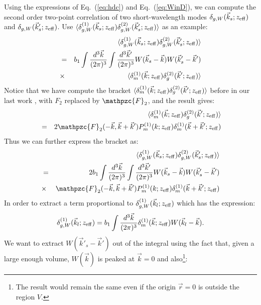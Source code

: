\documentclass[prd,amsmath,amssymb,floatfix,superscriptaddress,nofootinbib,twocolumn]{revtex4-1}
\newcommand{\vrr}{\vec{r}}
\newcommand{\vs}{\nonumber\\}
\newcommand{\ec}[1]{Eq.~(\ref{eq:#1})}
\begin{document}
Using the expressions of \ec{hdc} and \ec{WinD}, we can compute the second order two-point correlation of two short-wavelength modes $\delta_{g,W}(\vec{k}_s;z_{\rm eff})$ and $\delta_{g,W}(\vec{k}'_s;z_{\rm eff})$. Use $\langle \delta^{(1)}_{g,W}(\vec{k}_s;z_{\rm eff})\delta^{(2)}_{g,W}(\vec{k}'_s;z_{\rm eff})\rangle$ as an example:
\begin{eqnarray}
&&\langle \delta^{(1)}_{g,W}(\vec{k}_s;z_{\rm eff})\delta^{(2)}_{g,W}(\vec{k}'_s;z_{\rm eff})\rangle\nonumber\\
&=&b_{1}\int \frac{d^{3}\vec{k}}{(2\pi)^3}\int \frac{d^{3}\vec{k}'}{(2\pi)^3}W(\vec{k}_s-\vec{k})W(\vec{k}'_s-\vec{k}')\nonumber\\
&\times & \langle \delta^{(1)}_{m}(\vec{k};z_{\rm eff})\delta^{(2)}_{g}(\vec{k}';z_{\rm eff})\rangle
\end{eqnarray}
Notice that we have compute the bracket $\langle \delta^{(1)}_{m}(\vec{k};z_{\rm eff})\delta^{(2)}_{g}(\vec{k}';z_{\rm eff})\rangle$ before in our last work \cite{Li:2020fir}, with $F_{2}$ replaced by $\mathpzc{F}_{2}$, and the result gives:
\begin{eqnarray}
&&\langle \delta^{(1)}_{m}(\vec{k};z_{\rm eff})\delta^{(2)}_{g}(\vec{k}';z_{\rm eff})\rangle\vs
&=&2\mathpzc{F}_{2}(-\vec{k},\vec{k}+\vec{k}')P_{m}^{(1)}(k;z_{\rm eff})\delta_{m}^{(1)}(\vec{k}+\vec{k}';z_{\rm eff})
\end{eqnarray}
Thus we can further express the bracket as:
\begin{eqnarray}
&&\langle \delta^{(1)}_{g,W}(\vec{k}_s;z_{\rm eff})\delta^{(2)}_{g,W}(\vec{k}'_s;z_{\rm eff})\rangle\nonumber\\
&=&2b_{1}\int \frac{d^{3}\vec{k}}{(2\pi)^3}\int \frac{d^{3}\vec{k}'}{(2\pi)^3}W(\vec{k}_s-\vec{k})W(\vec{k}'_s-\vec{k}')\nonumber\\
&\times &\mathpzc{F}_{2}(-\vec{k},\vec{k}+\vec{k}')P_{m}^{(1)}(k;z_{\rm eff})\delta_{m}^{(1)}(\vec{k}+\vec{k}';z_{\rm eff})
\end{eqnarray}
In order to extract a term proportional to $\delta^{(1)}_{g,W}(\vec{k}_l;z_{\rm eff})$ which has the expression:
\begin{eqnarray}
\delta^{(1)}_{g,W}(\vec{k}_l;z_{\rm eff})=b_{1}\int \frac{d^{3}\vec{k}}{(2\pi)^3}\delta_{m}^{(1)}(\vec{k};z_{\rm eff})W(\vec{k}_l-\vec{k}).
\end{eqnarray}
We want to extract $W(\vec{k}'_s-\vec{k}')$ out of the integral using the fact that, given a large enough volume, $W(\vec{k})$ is peaked at $\vec{k}=0$ and also\footnote{The result would remain the same even if the origin $\vrr=0$ is outside the region $V$.}:
\end{document}
